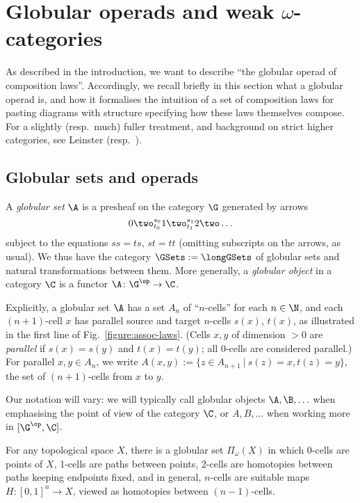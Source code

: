 
\section{Globular operads and weak \texorpdfstring{$\omega$}{omega}-categories}\label{sec:operads-background}

\noindent As described in the introduction, we want to describe ``the globular operad of composition laws''.  Accordingly, we recall briefly in this section what a globular operad is, and how it formalises the intuition of a set of composition laws for pasting diagrams with structure specifying how these laws themselves compose.  For a slightly (resp.\ much) fuller treatment, and background on strict higher categories, see Leinster \cite{leinster:survey} (resp.\ \cite{leinster:book}).

\subsection{Globular sets and operads}

A \emph{globular set} $\A$ is a presheaf on the category $\G$ generated by arrows
\[0 \two^{s_0}_{t_0} 1 \two^{s_1}_{t_1} 2 \two \ldots \]
subject to the equations $ss = ts$, $st = tt$ (omitting subscripts on the arrows, as usual).  We thus have the category $\GSets := \longGSets$ of globular sets and natural transformations between them.  More generally, a \emph{globular object} in a category $\C$ is a functor $\A \colon  \G^\op \to \C$.  

Explicitly, a globular set $\A$ has a set $A_n$ of ``$n$-cells'' for each $n \in \N$, and each $(n+1)$-cell $x$ has parallel source and target $n$-cells $s(x)$, $t(x)$, as illustrated in the first line of Fig.~\ref{figure:assoc-laws}.  (Cells $x,y$ of dimension $>0$ are \emph{parallel} if $s(x) = s(y)$ and $t(x) = t(y)$; all $0$-cells are considered parallel.)  For parallel $x,y \in A_n$, we write $A(x,y) := \{ z \in A_{n+1}\ |\ s(z) = x, t(z) = y\}$, the set of $(n+1)$-cells from $x$ to $y$.

Our notation will vary: we will typically call globular objects $\A, \B, \ldots$ when emphasising the point of view of the category $\C$, or $A, B, \ldots$ when working more in $[\G^\op, \C]$.  %

\begin{exa} \label{ex:pi-omega}For any topological space $X$, there is a globular set $\Pi_\omega(X)$ in which 0-cells are points of $X$, 1-cells are paths between points, 2-cells are homotopies between paths keeping endpoints fixed, and in general, $n$-cells are suitable maps $H\colon [0,1]^n \to X$, viewed as homotopies between $(n-1)$-cells.
\end{exa}

